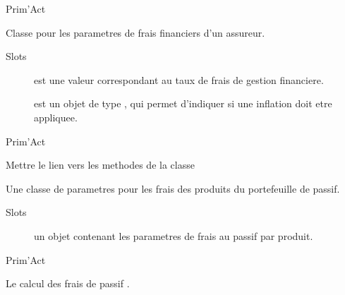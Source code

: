 \documentclass[a4paper]{book}
\begin{document}
%
\begin{Author}\relax
Prim'Act
\end{Author}
%
\begin{Description}\relax
Classe pour les parametres de frais financiers d'un assureur.
\end{Description}
%
\begin{Section}{Slots}

\begin{description}

\item[] est une valeur  correspondant au taux de frais de gestion financiere.

\item[] est un objet de type , qui permet d'indiquer si une inflation
doit etre appliquee.

\end{description}
\end{Section}
%
\begin{Author}\relax
Prim'Act
\end{Author}
%
\begin{SeeAlso}\relax
Mettre le lien vers les methodes de la classe
\end{SeeAlso}
%
\begin{Description}\relax
Une classe de parametres pour les frais des produits du portefeuille de passif.
\end{Description}
%
\begin{Section}{Slots}

\begin{description}

\item[] un objet  contenant les parametres de frais au passif par produit.

\end{description}
\end{Section}
%
\begin{Author}\relax
Prim'Act
\end{Author}
%
\begin{SeeAlso}\relax
Le calcul des frais de passif .
\end{SeeAlso}
\end{document}
